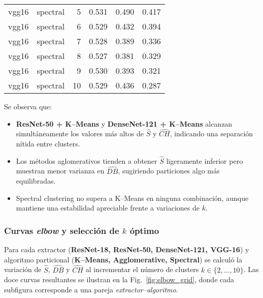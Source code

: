 \begin{longtable}{llrrrr}
      vgg16 &      spectral &  5 &            0.531 &   0.490 &    0.417 \\
      vgg16 &      spectral &  6 &            0.529 &   0.432 &    0.394 \\
      vgg16 &      spectral &  7 &            0.528 &   0.389 &    0.336 \\
      vgg16 &      spectral &  8 &            0.527 &   0.381 &    0.329 \\
      vgg16 &      spectral &  9 &            0.530 &   0.393 &    0.321 \\
      vgg16 &      spectral & 10 &            0.529 &   0.436 &    0.287 \\
\end{longtable}

Se observa que:

\begin{itemize}
  \item \textbf{ResNet-50 + K–Means} y \textbf{DenseNet-121 + K–Means}
        alcanzan simultáneamente los valores más altos de \(\widehat S\) y
        \(\widehat{CH}\), indicando una separación nítida entre clusters.
  \item Los métodos aglomerativos tienden a obtener \(\widehat S\) ligeramente
        inferior pero muestran menor varianza en \(\widehat{DB}\),
        sugiriendo particiones algo más equilibradas.
  \item Spectral clustering no supera a K–Means en ninguna combinación,
        aunque mantiene una estabilidad apreciable frente a variaciones de \(k\).
\end{itemize}

\subsubsection{Curvas \emph{elbow} y selección de $k$ óptimo}

Para cada extractor (\textbf{ResNet-18, ResNet-50, DenseNet-121, VGG-16})
y algoritmo particional (\textbf{K–Means, Agglomerative, Spectral})
se calculó la variación de \(\widehat S\), \(\widehat{DB}\) y
\(\widehat{CH}\) al incrementar el número de clusters
\(k\in\{2,\dots,10\}\).
Las doce curvas resultantes se ilustran en la
Fig.~\ref{fig:elbow_grid}, donde cada subfigura corresponde a una pareja
\emph{extractor–algoritmo}.


